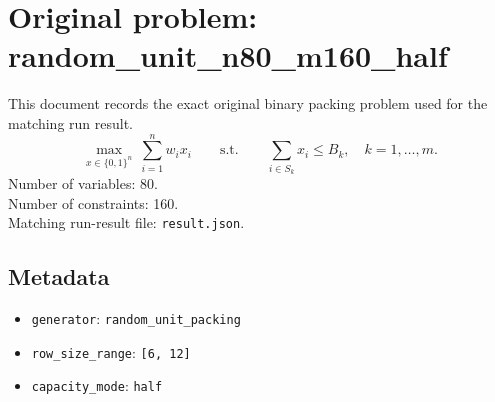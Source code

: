 \documentclass[11pt]{article}
\begin{document}
\section*{Original problem: random\_unit\_n80\_m160\_half}
This document records the exact original binary packing problem used for the matching run result.
\[
\max_{x\in\{0,1\}^n}\ \sum_{i=1}^n w_i x_i
\qquad\text{s.t.}\qquad
\sum_{i\in S_k} x_i \le B_k,\quad k=1,\dots,m.
\]
Number of variables: 80.\\
Number of constraints: 160.\\
Matching run-result file: \texttt{result.json}.
\subsection*{Metadata}
\begin{itemize}
\item \texttt{generator}: \texttt{random\_unit\_packing}
\item \texttt{row\_size\_range}: \texttt{[6, 12]}
\item \texttt{capacity\_mode}: \texttt{half}
\end{itemize}
\end{document}
